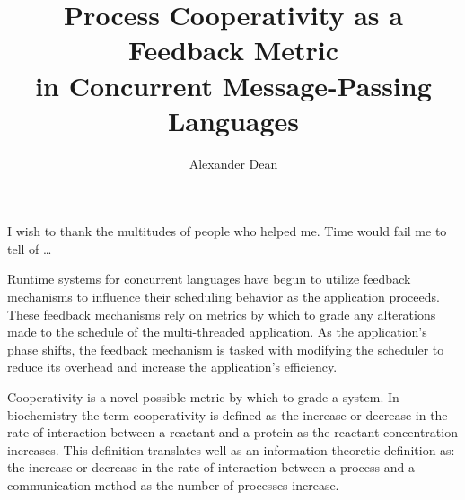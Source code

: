 \documentclass[12pt]{report}    %
\author{Alexander Dean}    %
\title{Process Cooperativity as a Feedback Metric \\
                in Concurrent Message-Passing Languages}
\theoremstyle{definition}
\theoremstyle{remark}
\begin{document}


%
%
%
\commcertpage           %

\titlepage              %



%


\begin{acknowledgments}     %
%
I wish to thank the multitudes of people who helped me. Time would
fail me to tell of \ldots
\end{acknowledgments}


%
\utabstract
{}%
\indent
Runtime systems for concurrent languages have begun to utilize feedback
mechanisms to influence their scheduling behavior as the application proceeds.
These feedback mechanisms rely on metrics by which to grade any alterations made
to the schedule of the multi-threaded application. As the application's phase
shifts, the feedback mechanism is tasked with modifying the scheduler to reduce
its overhead and increase the application's efficiency.

Cooperativity is a novel possible metric by which to grade a system. In
biochemistry the term cooperativity is defined as the increase or decrease in
the rate of interaction between a reactant and a protein as the reactant
concentration increases. This definition translates well as an information
theoretic definition as: the increase or decrease in the rate of interaction
between a process and a communication method as the number of processes
increase.
\end{document}
